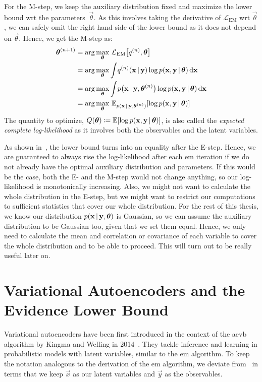 	For the M-step, we keep the auxiliary distribution fixed and maximize the lower bound \ac{wrt} the parameters~\(\vec{\theta}\). As this involves taking the derivative of \(\mathcal{L}_\mathrm{EM}\) \ac{wrt} \(\vec{\theta}\), we can safely omit the right hand side of the lower bound as it does not depend on \(\vec{\theta}\). Hence, we get the M-step as:
	\begin{align*}
		\boldsymbol{\mathrm{\theta}}^{(n + 1)}
			&= \arg\max_{\boldsymbol{\mathrm{\theta}}}\, \mathcal{L}_\mathrm{EM}\big[ q^{(n)}, \boldsymbol{\mathrm{\theta}} \big] \\
			&= \arg\max_{\boldsymbol{\mathrm{\theta}}} \int\! q^{(n)}(\boldsymbol{\mathrm{x}} \,\vert\, \boldsymbol{\mathrm{y}}) \log p(\boldsymbol{\mathrm{x}}, \boldsymbol{\mathrm{y}} \,\vert\, \boldsymbol{\mathrm{\theta}}) \dd{\boldsymbol{\mathrm{x}}} \\
			&= \arg\max_{\boldsymbol{\mathrm{\theta}}} \int\! p\big(\boldsymbol{\mathrm{x}} \,\big\vert\, \boldsymbol{\mathrm{y}}, \boldsymbol{\mathrm{\theta}}^{(n)}\big) \log p(\boldsymbol{\mathrm{x}}, \boldsymbol{\mathrm{y}} \,\vert\, \boldsymbol{\mathrm{\theta}}) \dd{\boldsymbol{\mathrm{x}}} \\
			&= \arg\max_{\boldsymbol{\mathrm{\theta}}}\, \mathbb{E}_{p(\boldsymbol{\mathrm{x}} \,\vert\, \boldsymbol{\mathrm{y}}, \boldsymbol{\mathrm{\theta}}^{(n)})}[\log p(\boldsymbol{\mathrm{x}}, \boldsymbol{\mathrm{y}} \,\vert\, \boldsymbol{\mathrm{\theta}})]
	\end{align*}
	The quantity to optimize, \( Q(\boldsymbol{\mathrm{\theta}}) \coloneqq \mathbb{E}[\log p(\boldsymbol{\mathrm{x}}, \boldsymbol{\mathrm{y}} \,\vert\, \boldsymbol{\mathrm{\theta}})] \), is also called the \emph{expected complete log-likelihood} as it involves both the observables and the latent variables.

	As shown in~\cite{bealVariationalAlgorithmsApproximate2003a}, the lower bound turns into an equality after the E-step. Hence, we are guaranteed to always rise the log-likelihood after each \ac{em} iteration if we do not already have the optimal auxiliary distribution and parameters. If this would be the case, both the E- and the M-step would not change anything, so our log-likelihood is monotonically increasing. Also, we might not want to calculate the whole distribution in the E-step, but we might want to restrict our computations to sufficient statistics that cover our whole distribution. For the rest of this thesis, we know our distribution \( p(\boldsymbol{\mathrm{x}} \,\vert\, \boldsymbol{\mathrm{y}}, \boldsymbol{\mathrm{\theta}}) \) is Gaussian, so we can assume the auxiliary distribution to be Gaussian too, given that we set them equal. Hence, we only need to calculate the mean and correlation or covariance of each variable to cover the whole distribution and to be able to proceed. This will turn out to be really useful later on.

\section{Variational Autoencoders and the Evidence Lower Bound}
	Variational autoencoders have been first introduced in the context of the \ac{aevb} algorithm by Kingma and Welling in 2014~\cite{kingmaAutoEncodingVariationalBayes2014}. They tackle inference and learning in probabilistic models with latent variables, similar to the \ac{em} algorithm. To keep the notation analogous to the derivation of the \ac{em} algorithm, we deviate from~\cite{kingmaAutoEncodingVariationalBayes2014} in terms that we keep \(\vec{x}\) as our latent variables and \(\vec{y}\) as the observables.

